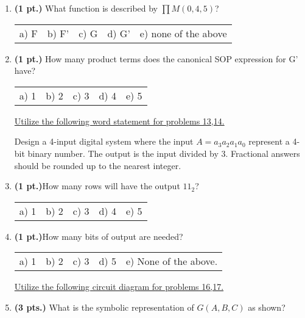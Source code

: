 \documentclass{article}
\begin{document}
\begin{enumerate}
\item {\bf (1 pt.)} What function is described by $\prod M(0,4,5)$?

\begin{tabular}{p{0.7in} p{0.7in} p{0.7in} p{0.7in} l}
a) F & b) F' & c) G & d) G' & e) none of the above
\end{tabular}


\item {\bf (1 pt.)} How many product terms does the canonical SOP expression 
for G' have?

\begin{tabular}{p{0.7in} p{0.7in} p{0.7in} p{0.7in} l}
a) 1 & b) 2 & c) 3 & d) 4 & e) 5
\end{tabular}

\underline{Utilize the following word statement for problems 13,14.}

Design a 4-input digital system where the input $A=a_3a_2a_1a_0$ represent 
a 4-bit binary number.  The output is the input divided by 3.  Fractional
answers should be rounded up to the nearest integer.

\item {\bf (1 pt.)}How many rows will have the output $11_2$?

\begin{tabular}{p{0.7in} p{0.7in} p{0.7in} p{0.7in} l}
a) 1 & b) 2 & c) 3 & d) 4 & e) 5
\end{tabular}

\item {\bf (1 pt.)}How many bits of output are needed?

\begin{tabular}{p{0.7in} p{0.7in} p{0.7in} p{0.7in} l}
a) 1 & b) 2 & c) 3 & d) 5 & e) None of the above.
\end{tabular}

\pagebreak

\underline{Utilize the following circuit diagram for problems 16,17.}

\begin{figure}[ht]
\end{figure}

\item {\bf (3 pts.)} What is the symbolic representation of 
$G(A,B,C)$ as shown?  


\end{enumerate}
\end{document}
